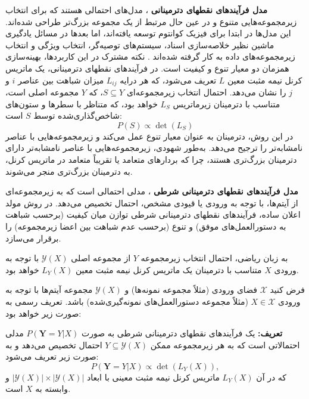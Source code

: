 \noindent\textbf{مدل فرآیندهای نقطه\/ای دترمینانی }
\cite{DPP}
 ، مدل‌های احتمالی هستند که برای انتخاب زیرمجموعه‌هایی متنوع و در عین حال مرتبط از یک مجموعه بزرگ‌تر طراحی شده‌اند. 
این مدل‌ها در ابتدا برای فیزیک کوانتوم توسعه یافته‌اند، اما بعدها در مسائل یادگیری ماشین نظیر خلاصه‌سازی اسناد، سیستم‌های توصیه‌گر، انتخاب ویژگی و انتخاب زیرمجموعه‌های داده به کار گرفته شده‌اند \cite{DPP_for_ML}.
نکته مشترک در این کاربردها، بهینه‌سازی همزمان دو معیار تنوع
 و کیفیت
  است.
در فرآیندهای نقطه\/ای دترمینانی، یک ماتریس کرنل
 نیمه مثبت معین
  \( L \) تعریف می‌شود، که هر درایه \( L_{ij} \) میزان شباهت
   بین عناصر \( i \) و \( j \) را نشان می‌دهد. احتمال انتخاب زیرمجموعه‌ای \( S \subseteq Y \)، که \( Y \) مجموعه اصلی است، متناسب با دترمینان زیرماتریس \( L_S \) خواهد بود، که متناظر با سطرها و ستون‌های شاخص‌گذاری‌شده توسط \( S \) است:
\begin{equation}
	P(S) \propto \det(L_S)
\end{equation}
در این روش، دترمینان به عنوان معیار تنوع عمل می‌کند و زیرمجموعه‌هایی با عناصر نامشابه‌تر را ترجیح می‌دهد. به‌طور شهودی، زیرمجموعه‌هایی با عناصر نامشابه‌تر دارای دترمینان بزرگ‌تری هستند، چرا که بردارهای متعامد
 یا تقریباً متعامد
  در ماتریس کرنل، به دترمینان بزرگ‌تری منجر می‌شوند.

\noindent\textbf{مدل فرآیندهای نقطه\/ای دترمینانی شرطی}
 ، مدلی احتمالی است که به زیرمجموعه‌ای از آیتم‌ها، با توجه به ورودی یا قیودی مشخص، احتمال تخصیص می‌دهد.
در روش مولد اعلان ساده، فرآیندهای نقطه\/ای دترمینانی شرطی توازن میان کیفیت (برحسب شباهت به دستورالعمل‌های موفق) و تنوع (برحسب عدم شباهت بین اعضا زیرمجموعه) را برقرار می‌سازد.

به زبان ریاضی، احتمال انتخاب زیرمجموعه \( Y \) از مجموعه اصلی \( \mathcal{Y}(X) \) با توجه به ورودی \( X \) متناسب با دترمینان یک ماتریس کرنل نیمه مثبت معین \( L_Y(X) \) خواهد بود.

\noindent فرض کنید \( \mathcal{X} \) فضای ورودی (مثلاً مجموعه نمونه‌ها) و \( \mathcal{Y}(X) \) مجموعه آیتم‌ها با توجه به ورودی \( X \in \mathcal{X} \) (مثلاً مجموعه دستورالعمل‌های نمونه‌گیری‌شده) باشد.
تعریف رسمی به صورت زیر خواهد بود:

\noindent
\textbf{تعریف: } یک فرآیندهای نقطه\/ای دترمینانی شرطی به صورت \( P(\textbf{Y} = Y |X) \) مدلی احتمالاتی است که به هر زیرمجموعه ممکن \( Y \subseteq \mathcal{Y}(X) \) احتمال تخصیص می‌دهد و به صورت زیر تعریف می‌شود:
\begin{equation}
	P(\textbf{Y} = Y |X) \propto \det(L_{Y} (X)),
\end{equation} 
که در آن \( L_{Y}(X) \) ماتریس کرنل نیمه مثبت معینی با ابعاد \( \left|\mathcal{Y}(X) \right| \times \left|\mathcal{Y}(X)\right| \) و وابسته به \( X \) است.

